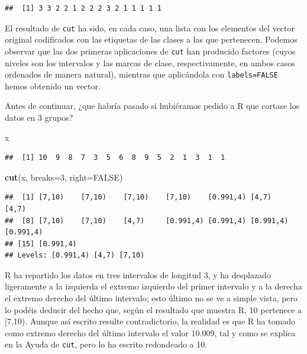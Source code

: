 \documentclass[]{book}
\newenvironment{Shaded}{\begin{snugshade}}{\end{snugshade}}
\newcommand{\DataTypeTok}[1]{\textcolor[rgb]{0.13,0.29,0.53}{#1}}
\newcommand{\DecValTok}[1]{\textcolor[rgb]{0.00,0.00,0.81}{#1}}
\newcommand{\KeywordTok}[1]{\textcolor[rgb]{0.13,0.29,0.53}{\textbf{#1}}}
\newcommand{\NormalTok}[1]{#1}
\newcommand{\OtherTok}[1]{\textcolor[rgb]{0.56,0.35,0.01}{#1}}
\theoremstyle{definition}
\theoremstyle{definition}
\theoremstyle{definition}
\theoremstyle{remark}
\begin{document}
\begin{verbatim}
##  [1] 3 3 2 2 1 2 2 2 3 2 1 1 1 1 1
\end{verbatim}

El resultado de \texttt{cut} ha sido, en cada caso, una lista con los elementos del vector original codificados con las etiquetas de las clases a las que pertenecen. Podemos observar que las dos primeras aplicaciones de \texttt{cut} han producido factores (cuyos niveles son los intervalos y las marcas de clase, respectivamente, en ambos casos ordenados de manera natural), mientras que aplicándola con \texttt{labels=FALSE} hemos obtenido un vector.

Antes de continuar, ¿que habría pasado si hubiéramos pedido a R que cortase los datos en 3 grupos?

\begin{Shaded}
\begin{Highlighting}[]
\NormalTok{x}
\end{Highlighting}
\end{Shaded}

\begin{verbatim}
##  [1] 10  9  8  7  3  5  6  8  9  5  2  1  3  1  1
\end{verbatim}

\begin{Shaded}
\begin{Highlighting}[]
\KeywordTok{cut}\NormalTok{(x, }\DataTypeTok{breaks=}\DecValTok{3}\NormalTok{, }\DataTypeTok{right=}\OtherTok{FALSE}\NormalTok{)}
\end{Highlighting}
\end{Shaded}

\begin{verbatim}
##  [1] [7,10)    [7,10)    [7,10)    [7,10)    [0.991,4) [4,7)     [4,7)    
##  [8] [7,10)    [7,10)    [4,7)     [0.991,4) [0.991,4) [0.991,4) [0.991,4)
## [15] [0.991,4)
## Levels: [0.991,4) [4,7) [7,10)
\end{verbatim}

R ha repartido los datos en tres intervalos de longitud 3, y ha desplazado ligeramente a la izquierda el extremo izquierdo del primer intervalo y a la derecha el extremo derecho del último intervalo; esto último no se ve a simple vista, pero lo podéis deducir del hecho que, según el resultado que muestra R, 10 pertenece a {[}7,10). Aunque así escrito resulte contradictorio, la realidad es que R ha tomado como extremo derecho del último intervalo el valor 10.009, tal y como se explica en la Ayuda de \texttt{cut}, pero lo ha escrito redondeado a 10.
\end{document}
